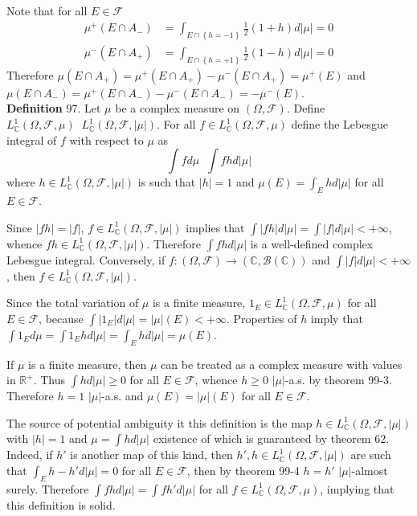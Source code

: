 \documentclass[a4paper]{article}
\newcommand{\obj}[1]{\left\{ #1 \right \}}
\newcommand{\brac}[1]{\left ( #1 \right )}
\newcommand{\abs}[1]{\left | #1 \right |}
\newcommand{\Real}{\mathbb{R}}
\newcommand{\Cplx}{\mathbb{C}}
\newcommand{\Fcal}{\mathcal{F}}
\newcommand{\borel}[1]{\mathcal{B}\brac{#1}}
\newcommand{\defn}{\mathop{\overset{\Delta}{=}}\nolimits}
\begin{document}
Note that for all $E\in \Fcal$ \begin{align*}\mu^+\brac{E\cap A_-} &= \int_{E\cap \obj{h=-1}} \frac{1}{2} \brac{1+h} d\abs{\mu} = 0\\ \mu^-\brac{E\cap A_+} &= \int_{E\cap \obj{h=+1}} \frac{1}{2} \brac{1-h} d\abs{\mu} = 0\end{align*} Therefore $\mu\brac{E\cap A_+} = \mu^+\brac{E\cap A_+} - \mu^-\brac{E\cap A_+} = \mu^+\brac{E}$ and $\mu\brac{E\cap A_-} = \mu^+\brac{E\cap A_-} - \mu^-\brac{E\cap A_-} = -\mu^-\brac{E}$.\\



\noindent \textbf{Definition} 97.
Let $\mu$ be a complex measure on $\brac{\Omega, \Fcal}$. Define $L^1_\Cplx\brac{\Omega, \Fcal, \mu}\defn L^1_\Cplx\brac{\Omega, \Fcal, \abs{\mu}}$. For all $f\in L^1_\Cplx\brac{\Omega, \Fcal, \mu}$ define the Lebesgue integral of $f$ with respect to $\mu$ as \[\int f d\mu \defn \int f h d\abs{\mu}\] where $h\in L^1_\Cplx\brac{\Omega, \Fcal, \abs{\mu}}$ is such that $\abs{h}=1$ and $\mu\brac{E}=\int_E h d\abs{\mu}$ for all $E\in \Fcal$.

Since $\abs{f h} = \abs{f}$, $f\in L^1_\Cplx\brac{\Omega, \Fcal, \abs{\mu}}$ implies that $\int \abs{f h} d\abs{\mu} = \int \abs{f} d\abs{\mu} < +\infty$, whence $f h\in L^1_\Cplx\brac{\Omega, \Fcal, \abs{\mu}}$. Therefore $\int f h d\abs{\mu}$ is a well-defined complex Lebesgue integral. Conversely, if $f:\brac{\Omega, \Fcal}\to \brac{\Cplx, \borel{\Cplx}}$ and $\int \abs{f} d\abs{\mu}<+\infty$, then $f\in L^1_\Cplx\brac{\Omega, \Fcal, \abs{\mu}}$.

Since the total variation of $\mu$ is a finite measure, $1_E\in L^1_\Cplx\brac{\Omega, \Fcal, \mu}$ for all $E\in \Fcal$, because $\int \abs{1_E} d\abs{\mu} = \abs{\mu}\brac{E}<+\infty$. Properties of $h$ imply that $\int 1_E d\mu = \int 1_E h d\abs{\mu} = \int_E h d\abs{\mu} = \mu\brac{E}$.

If $\mu$ is a finite measure, then $\mu$ can be treated as a complex measure with values in $\Real^+$. Thus $\int h d\abs{\mu}\geq 0$ for all $E\in \Fcal$, whence $h\geq 0$ $\abs{\mu}$-a.s. by theorem 99-3. Therefore $h=1$ $\abs{\mu}$-a.s. and $\mu\brac{E} = \abs{\mu}\brac{E}$ for all $E\in \Fcal$.

The source of potential ambiguity it this definition is the map $h\in L^1_\Cplx\brac{\Omega, \Fcal, \abs{\mu}}$ with $\abs{h}=1$ and $\mu=\int h d\abs{\mu}$ existence of which is guaranteed by theorem 62. Indeed, if $h'$ is another map of this kind, then $h',h\in L^1_\Cplx\brac{\Omega, \Fcal, \abs{\mu}}$ are such that $\int_E h-h' d\abs{\mu}=0$ for all $E\in \Fcal$, then by theorem 99-4 $h=h'$ $\abs{\mu}$-almost surely. Therefore $\int f h d\abs{\mu} = \int f h' d\abs{\mu}$ for all $f\in L^1_\Cplx\brac{\Omega, \Fcal, \mu}$, implying that this definition is solid.
\end{document}
